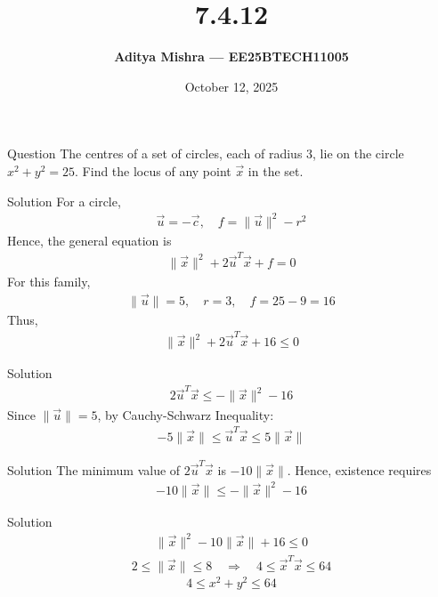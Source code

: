 \documentclass{beamer}
\title{\textbf{7.4.12}}
\author{\textbf{Aditya Mishra — EE25BTECH11005}}
\date{October 12, 2025}
\begin{document}
\begin{frame}
\titlepage
\end{frame}

\begin{frame}{Question}
The centres of a set of circles, each of radius \(3\), lie on the circle \(x^2 + y^2 = 25\).
Find the locus of any point \(\vec{x}\) in the set.
\end{frame}

\begin{frame}{Solution}
For a circle,
\begin{align}
\vec{u} = -\vec{c}, \quad f = \|\vec{u}\|^2 - r^2
\end{align}
Hence, the general equation is
\begin{align}
\|\vec{x}\|^2 + 2\vec{u}^T\vec{x} + f = 0
\end{align}
For this family,
\begin{align}
\|\vec{u}\| = 5, \quad r = 3, \quad f = 25 - 9 = 16
\end{align}
Thus,
\begin{align}
\|\vec{x}\|^2 + 2\vec{u}^T\vec{x} + 16 \le 0
\end{align}
\end{frame}

\begin{frame}{Solution}
\begin{align}
2\vec{u}^T\vec{x} \le -\|\vec{x}\|^2 - 16
\end{align}
Since \(\|\vec{u}\| = 5\), by Cauchy-Schwarz Inequality:
\begin{align}
-5\|\vec{x}\| \le \vec{u}^T\vec{x} \le 5\|\vec{x}\|
\end{align}
\end{frame}

\begin{frame}{Solution}
The minimum value of \(2\vec{u}^T\vec{x}\) is \(-10\|\vec{x}\|\).  
Hence, existence requires
\begin{align}
-10\|\vec{x}\| \le -\|\vec{x}\|^2 - 16
\end{align}
\end{frame}

\begin{frame}{Solution}
\begin{align}
\|\vec{x}\|^2 - 10\|\vec{x}\| + 16 \le 0
\end{align}
\begin{align}
2 \le \|\vec{x}\| \le 8
\quad \Rightarrow \quad
4 \le \vec{x}^T\vec{x} \le 64
\end{align}
\[
\boxed{4 \le x^2 + y^2 \le 64}
\]
\end{frame}
\end{document}
